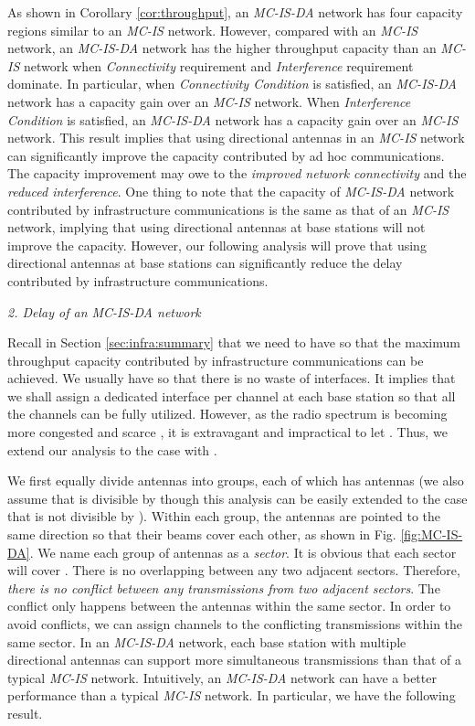 \documentclass[10pt,journal]{IEEEtran}
\begin{document}
As shown in Corollary \ref{cor:throughput}, an \textit{MC-IS-DA} network has four capacity regions similar to an \textit{MC-IS} network. However, compared with an \textit{MC-IS} network, an \textit{MC-IS-DA} network has the higher throughput capacity than an \textit{MC-IS} network when {\it Connectivity} requirement and {\it Interference} requirement dominate. In particular, when \textit{Connectivity Condition} is satisfied, an \textit{MC-IS-DA} network has a capacity gain  over an \textit{MC-IS} network. When \textit{Interference Condition} is satisfied, an \textit{MC-IS-DA} network has a capacity gain  over an \textit{MC-IS} network. This result implies that using directional antennas in an \textit{MC-IS} network can significantly improve the capacity contributed by ad hoc communications. The capacity improvement may owe to the \emph{improved network connectivity} and the \emph{reduced interference}. One thing to note that the capacity of \textit{MC-IS-DA} network contributed by infrastructure communications  is the same as that of an \textit{MC-IS} network, implying that using directional antennas at base stations will not improve the capacity. However, our following analysis will prove that using directional antennas at base stations can significantly reduce the delay contributed by infrastructure communications.

\emph{2. Delay of an MC-IS-DA network}

Recall in Section \ref{sec:infra:summary} that we need to have  so that the maximum throughput capacity contributed by infrastructure communications can be achieved. We usually have  so that there is no waste of interfaces. It implies that we shall assign a dedicated interface per channel at each base station so that all the  channels can be fully utilized. However, as the radio spectrum is becoming more congested and scarce \cite{Akyildiz:2006}, it is extravagant and impractical to let . Thus, we extend our analysis to the case with . 

We first equally divide  antennas into  groups, each of which has  antennas (we also assume that  is divisible by  though this analysis can be easily extended to the case that  is not divisible by ). Within each group, the  antennas are pointed to the same direction so that their beams cover each other, as shown in Fig. \ref{fig:MC-IS-DA}. We name each group of antennas as a \emph{sector}. It is obvious that each sector will cover . There is no overlapping between any two adjacent sectors. Therefore, {\it there is no conflict between any transmissions from two adjacent sectors}. The conflict only happens between the antennas within the same sector. In order to avoid conflicts, we can assign  channels to the conflicting transmissions within the same sector. In an \emph{MC-IS-DA} network, each base station with multiple directional antennas can support more simultaneous transmissions than that of a typical \emph{MC-IS} network. Intuitively, an \emph{MC-IS-DA} network can have a better performance than a typical \emph{MC-IS} network. In particular, we have the following result.
\end{document}
